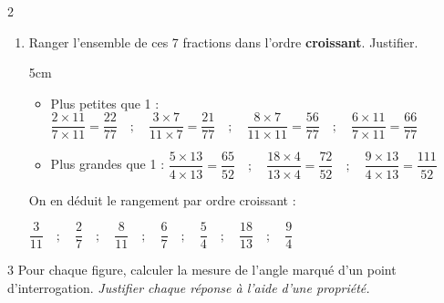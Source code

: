 \documentclass[a4paper]{book}
\begin{document}
{\begin{exerciceNote}{2}
\begin{enumerate}[leftmargin=*]
            \begin{ZoneReponse}{2.5cm}
                \begin{itemize}[leftmargin=*]
                    \item Plus petites que 1 : \quad $\dfrac{2}{7} \quad ; \quad \dfrac{3}{11} \quad ; \quad  \dfrac{8}{11} \quad ; \quad  \dfrac{6}{7}$

                    \item Plus grandes que 1 : \quad $\dfrac{5}{4} \quad ; \quad \dfrac{18}{13} \quad ; \quad \dfrac{9}{4}$
                \end{itemize}
            \end{ZoneReponse}


\newpage

            
            \item Ranger l'ensemble de ces 7 fractions dans l'ordre \textbf{croissant}. Justifier.

            \begin{ZoneReponse}{5cm}
                \begin{itemize}[leftmargin=*]
                    \item Plus petites que 1 : \quad $\dfrac{2\times11}{7\times11}=\dfrac{22}{77} \quad ; \quad \dfrac{3\times7}{11\times7}=\dfrac{21}{77} \quad ; \quad  \dfrac{8\times7}{11\times11}=\dfrac{56}{77} \quad ; \quad  \dfrac{6\times11}{7\times11}=\dfrac{66}{77}$

                    \bigskip

                    \item Plus grandes que 1 : \quad $\dfrac{5\times13}{4\times13}=\dfrac{65}{52} \quad ; \quad \dfrac{18\times4}{13\times4}=\dfrac{72}{52} \quad ; \quad \dfrac{9\times13}{4\times13}=\dfrac{111}{52} $ 
                \end{itemize}

                \bigskip

                On en déduit le rangement par ordre croissant : 

                 $\dfrac{3}{11} \quad ; \quad \dfrac{2}{7} \quad ; \quad \dfrac{8}{11} \quad ; \quad  \dfrac{6}{7} \quad ; \quad \dfrac{5}{4} \quad ; \quad \dfrac{18}{13} \quad ; \quad \dfrac{9}{4} $
            \end{ZoneReponse}
        \end{enumerate}
    \end{exerciceNote}


    \begin{exerciceNote}{3}
        Pour chaque figure, calculer la mesure de l'angle marqué d'un point d'interrogation. \textit{Justifier chaque réponse à l'aide d'une propriété.}


\end{exerciceNote}}
\end{document}
